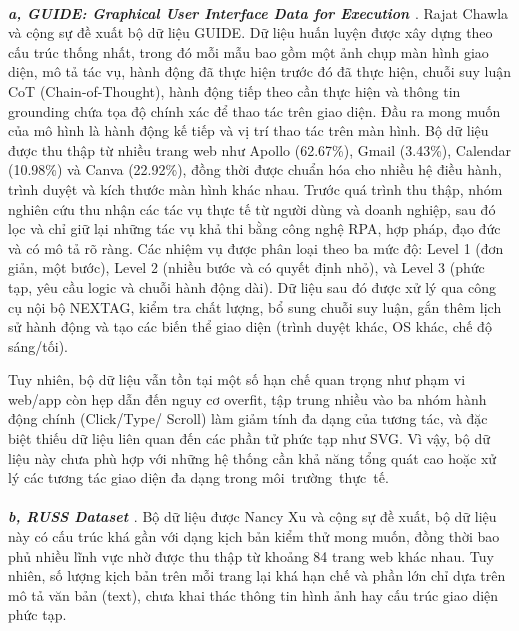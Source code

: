 \documentclass[a4paper, 12pt]{report}
\begin{document}
{\paragraph{}
\textit{\textbf{a, GUIDE: Graphical User Interface Data for Execution \cite{chawla2024guidegraphicaluserinterface}}}. Rajat Chawla và cộng sự đề xuất bộ dữ liệu GUIDE. Dữ liệu huấn luyện được xây dựng theo cấu trúc thống nhất, trong đó mỗi mẫu bao gồm một ảnh chụp màn hình giao diện, mô tả tác vụ, hành động đã thực hiện trước đó đã thực hiện, chuỗi suy luận CoT (Chain-of-Thought), hành động tiếp theo cần thực hiện và thông tin grounding chứa tọa độ chính xác để thao tác trên giao diện. Đầu ra mong muốn của mô hình là hành động kế tiếp và vị trí thao tác trên màn hình. Bộ dữ liệu được thu thập từ nhiều trang web như Apollo (62.67\%), Gmail (3.43\%), Calendar (10.98\%) và Canva (22.92\%), đồng thời được chuẩn hóa cho nhiều hệ điều hành, trình duyệt và kích thước màn hình khác nhau. Trước quá trình thu thập, nhóm nghiên cứu thu nhận các tác vụ thực tế từ người dùng và doanh nghiệp, sau đó lọc và chỉ giữ lại những tác vụ khả thi bằng công nghệ RPA, hợp pháp, đạo đức và có mô tả rõ ràng. Các nhiệm vụ được phân loại theo ba mức độ: Level 1 (đơn giản, một bước), Level 2 (nhiều bước và có quyết định nhỏ), và Level 3 (phức tạp, yêu cầu logic và chuỗi hành động dài). Dữ liệu sau đó được xử lý qua công cụ nội bộ NEXTAG, kiểm tra chất lượng, bổ sung chuỗi suy luận, gắn thêm lịch sử hành động và tạo các biến thể giao diện (trình duyệt khác, OS khác, chế độ sáng/tối). 



Tuy nhiên, bộ dữ liệu vẫn tồn tại một số hạn chế quan trọng như phạm vi web/app còn hẹp dẫn đến nguy cơ overfit, tập trung nhiều vào ba nhóm hành động chính (Click/Type/ Scroll) làm giảm tính đa dạng của tương tác, và đặc biệt thiếu dữ liệu liên quan đến các phần tử phức tạp như SVG. Vì vậy, bộ dữ liệu này chưa phù hợp với những hệ thống cần khả năng tổng quát cao hoặc xử lý các tương tác giao diện đa dạng trong môi~trường~thực~tế.

\paragraph{}


\textit{\textbf{b, RUSS Dataset \cite{xu2021groundingopendomaininstructionsautomate}}}. Bộ dữ liệu được Nancy Xu và cộng sự đề xuất, bộ dữ liệu này có cấu trúc khá gần với dạng kịch bản kiểm thử mong muốn, đồng thời bao phủ nhiều lĩnh vực nhờ được thu thập từ khoảng 84 trang web khác nhau. Tuy nhiên, số lượng kịch bản trên mỗi trang lại khá hạn chế và phần lớn chỉ dựa trên mô tả văn bản (text), chưa khai thác thông tin hình ảnh hay cấu trúc giao diện phức tạp.


}
\end{document}
